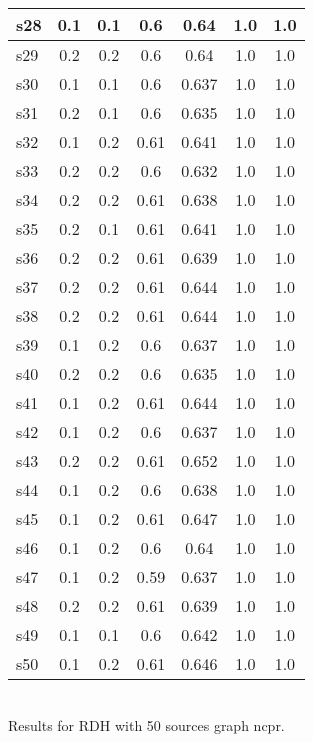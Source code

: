 \documentclass{article}
\begin{document}
\begin{tabular}{|l|c|c|c|c|c|c|}
\hline
s28 &0.1 & 0.1 & 0.6 & 0.64 & 1.0 & 1.0\\
\hline
s29 &0.2 & 0.2 & 0.6 & 0.64 & 1.0 & 1.0\\
\hline
s30 &0.1 & 0.1 & 0.6 & 0.637 & 1.0 & 1.0\\
\hline
s31 &0.2 & 0.1 & 0.6 & 0.635 & 1.0 & 1.0\\
\hline
s32 &0.1 & 0.2 & 0.61 & 0.641 & 1.0 & 1.0\\
\hline
s33 &0.2 & 0.2 & 0.6 & 0.632 & 1.0 & 1.0\\
\hline
s34 &0.2 & 0.2 & 0.61 & 0.638 & 1.0 & 1.0\\
\hline
s35 &0.2 & 0.1 & 0.61 & 0.641 & 1.0 & 1.0\\
\hline
s36 &0.2 & 0.2 & 0.61 & 0.639 & 1.0 & 1.0\\
\hline
s37 &0.2 & 0.2 & 0.61 & 0.644 & 1.0 & 1.0\\
\hline
s38 &0.2 & 0.2 & 0.61 & 0.644 & 1.0 & 1.0\\
\hline
s39 &0.1 & 0.2 & 0.6 & 0.637 & 1.0 & 1.0\\
\hline
s40 &0.2 & 0.2 & 0.6 & 0.635 & 1.0 & 1.0\\
\hline
s41 &0.1 & 0.2 & 0.61 & 0.644 & 1.0 & 1.0\\
\hline
s42 &0.1 & 0.2 & 0.6 & 0.637 & 1.0 & 1.0\\
\hline
s43 &0.2 & 0.2 & 0.61 & 0.652 & 1.0 & 1.0\\
\hline
s44 &0.1 & 0.2 & 0.6 & 0.638 & 1.0 & 1.0\\
\hline
s45 &0.1 & 0.2 & 0.61 & 0.647 & 1.0 & 1.0\\
\hline
s46 &0.1 & 0.2 & 0.6 & 0.64 & 1.0 & 1.0\\
\hline
s47 &0.1 & 0.2 & 0.59 & 0.637 & 1.0 & 1.0\\
\hline
s48 &0.2 & 0.2 & 0.61 & 0.639 & 1.0 & 1.0\\
\hline
s49 &0.1 & 0.1 & 0.6 & 0.642 & 1.0 & 1.0\\
\hline
s50 &0.1 & 0.2 & 0.61 & 0.646 & 1.0 & 1.0\\
\hline
\end{tabular}\\

\noindent Results for RDH with 50 sources graph ncpr.
\end{document}
